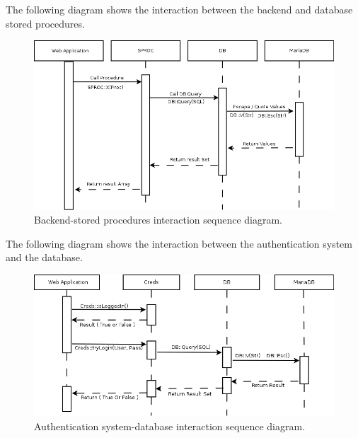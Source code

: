 \documentclass[12pt]{report}
\begin{document}
                    \newpage

                    The following diagram shows the interaction between the backend and database stored procedures.

                    \begin{figure}[H]
                    \caption{Backend-stored procedures interaction sequence diagram.}
                    \centering
                    \includegraphics[width=1\textwidth]{di/4}
                    \end{figure}

                    \newpage

                    The following diagram shows the interaction between the authentication system and the database.

                    \begin{figure}[H]
                    \caption{Authentication system-database interaction sequence diagram.}
                    \centering
                    \includegraphics[width=1\textwidth]{di/7}
                    \end{figure}

                    \newpage
\end{document}
